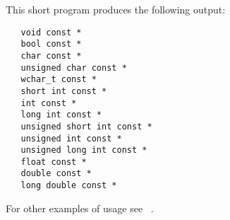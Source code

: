 This short program produces the following output:

\begin{verbatim}
   void const *
   bool const *
   char const *
   unsigned char const *
   wchar_t const *
   short int const *
   int const *
   long int const *
   unsigned short int const *
   unsigned int const *
   unsigned long int const *
   float const *
   double const *
   long double const *
\end{verbatim}

For other examples of usage see ~\cite{mirror-doc-mirror-examples}.

